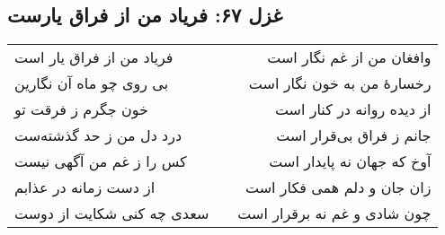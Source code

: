 \begin{center}
\section*{غزل ۶۷: فریاد من از فراق یارست}
\label{sec:067}
\begin{longtable}{l p{0.5cm} r}
فریاد من از فراق یار است
&&
وافغان من از غم نگار است
\\
بی روی چو ماه آن نگارین
&&
رخسارهٔ من به خون نگار است
\\
خون جگرم ز فرقت تو
&&
از دیده روانه در کنار است
\\
درد دل من ز حد گذشته‌ست
&&
جانم ز فراق بی‌قرار است
\\
کس را ز غم من آگهی نیست
&&
آوخ که جهان نه پایدار است
\\
از دست زمانه در عذابم
&&
زان جان و دلم همی فکار است
\\
سعدی چه کنی شکایت از دوست
&&
چون شادی و غم نه برقرار است
\\
\end{longtable}
\end{center}
